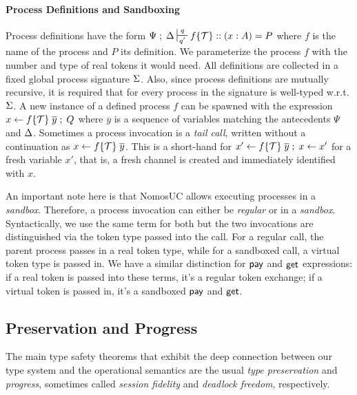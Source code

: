 


\paragraph*{\textbf{Process Definitions and Sandboxing}}
Process definitions have the form
$\Psi \semi \D \entailpot{q}{q'} f\{\Tokens\} :: (x : A) = P$ where $f$
is the name of the process and $P$ its definition.
We parameterize the process $f$ with the number and type of
real tokens it would need.
All definitions are collected in a fixed global process signature $\Sg$.
Also, since process definitions are mutually recursive, it is required that
for every process in the signature is well-typed w.r.t. $\Sg$.
A new instance of a defined process $f$ can be spawned with
the expression $\procdef{f\{\Tokens\}}{\overline{y}}{x} \semi Q$
where $\overline{y}$ is a sequence of variables matching the
antecedents $\Psi$ and $\D$.
Sometimes a process invocation is a \emph{tail call}, written without
a continuation as $\procdef{f\{\Tokens\}}{\overline{y}}{x}$.
This is a short-hand for
$\procdef{f\{\Tokens\}}{\overline{y}}{x'} \semi \fwd{x}{x'}$ for a
fresh variable $x'$, that is, a fresh channel is created and
immediately identified with $x$.

An important note here is that NomosUC allows executing processes in
a \emph{sandbox}.
Therefore, a process invocation can either be \emph{regular} or in a
\emph{sandbox}.
Syntactically, we use the same term for both but the two invocations
are distinguished via the token type passed into the call.
For a regular call, the parent process passes in a real token type,
while for a sandboxed call, a virtual token type is passed in.
We have a similar distinction for $\m{pay}$ and $\m{get}$ expressions:
if a real token is passed into these terms, it's a regular token
exchange; if a virtual token is passed in, it's a sandboxed $\m{pay}$
and $\m{get}$.

\subsection{Preservation and Progress}
The main type safety theorems that exhibit the deep connection between our type
system and the operational semantics are the usual \emph{type
preservation} and \emph{progress}, sometimes called \emph{session
fidelity} and \emph{deadlock freedom}, respectively.

